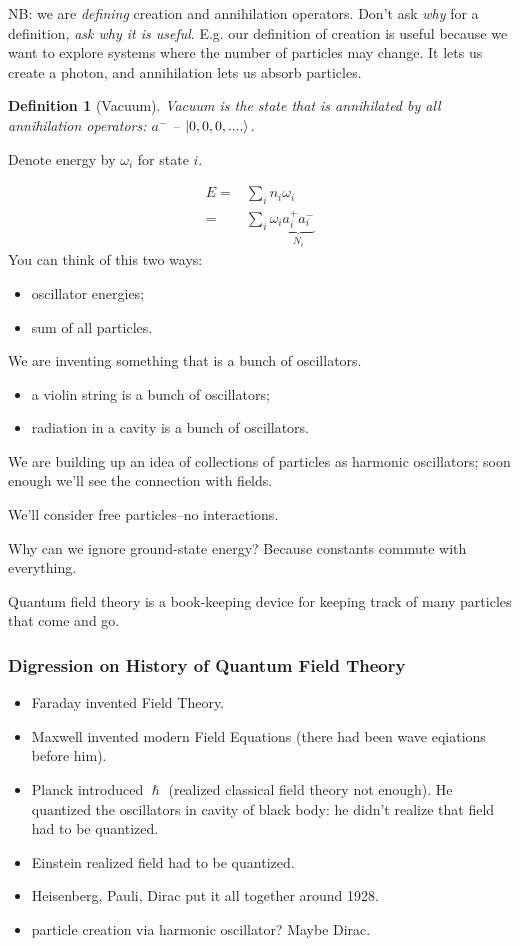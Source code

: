\documentclass[]{article}
\newtheorem{defn}[thm]{Definition}
\begin{document}
NB: we are \emph{defining} creation and annihilation operators. Don't ask \emph{why} for a definition, \emph{ask why it is useful}. E.g. our definition of creation is useful because we want to explore systems where the number of particles may change. It lets us create a photon, and annihilation lets us absorb particles.

\begin{defn}[Vacuum]
	Vacuum is the state that is annihilated by all annihilation operators: $a^-$ -- $\ket{0,0,0,....}$.
\end{defn}

Denote energy by $\omega_i$ for state $i$. 

\begin{align*}
	E =& \sum_{i} n_i \omega_i\\
	=& \sum_{i} \omega_i \underbrace{ a^+_i a^-_i}_\text{$N_i$} 
\end{align*}
You can think of this two ways:
\begin{itemize}
	\item oscillator energies;
	\item sum of all particles.
\end{itemize}

We are inventing something that is a bunch of oscillators.
\begin{itemize}
	\item a violin string is a bunch of oscillators;
	\item radiation in a cavity is a bunch of oscillators.
\end{itemize}
We are building up an idea of collections of particles as harmonic oscillators; soon enough we'll see the connection with fields.

We'll consider free particles--no interactions.

Why can we ignore ground-state energy? Because constants commute with everything. 

Quantum field theory is a book-keeping device for keeping track of many particles that come and go.

\subsubsection{Digression on History of  Quantum Field Theory }
\begin{itemize}
	\item Faraday invented Field Theory.
	\item Maxwell invented modern Field Equations (there had been wave eqiations before him).
	\item Planck introduced $\hslash$ (realized classical field theory not enough). He quantized the oscillators in cavity of black body: he didn't realize that field had to be quantized.
	\item Einstein realized field had to be quantized.
	\item Heisenberg, Pauli, Dirac put it all together around 1928.
	\item particle creation via harmonic oscillator? Maybe Dirac.
\end{itemize}
\end{document}
